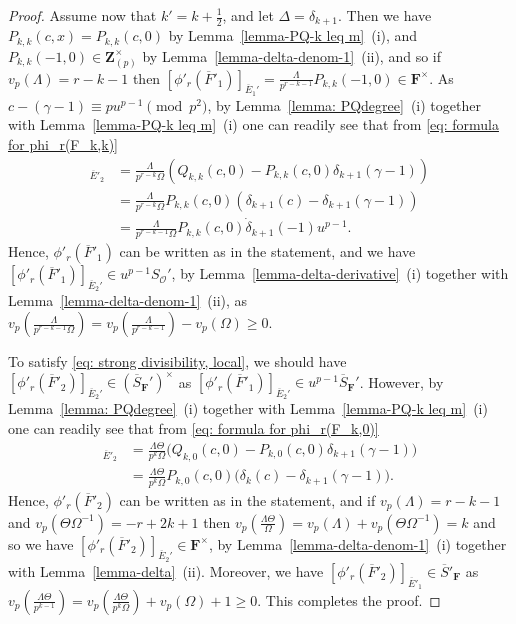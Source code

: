 \documentclass[11pt]{amsart}
\theoremstyle{definition}
\numberwithin{equation}{subsection}
\theoremstyle{plain}
\theoremstyle{plain}
\theoremstyle{plain}
\theoremstyle{plain}
\theoremstyle{plain}
\theoremstyle{plain}
\theoremstyle{plain}
\theoremstyle{plain}
\theoremstyle{plain}
\theoremstyle{plain}
\theoremstyle{plain}
\theoremstyle{plain}
\theoremstyle{definition}
\theoremstyle{definition}
\theoremstyle{definition}
\theoremstyle{remark}
\renewcommand{\(}{\textup{(}}
\renewcommand{\)}{\textup{)}}
\newcommand{\Z}{\mathbf{Z}}
\newcommand{\F}{\mathbf{F}}
\newcommand{\barS}{\overline{S}}
\newcommand{\cO}{\mathcal{O}}
\newcommand{\barE}{\overline{E}}
\newcommand{\barF}{\overline{F}}
\begin{document}
\begin{proof}
Assume now that $k'=k+\frac{1}{2}$, and let $\Delta=\delta_{k+1}$. Then we have $P_{k,k}(c,x)=P_{k,k}(c,0)$ by Lemma~\ref{lemma-PQ-k leq m}~(i), and $P_{k,k}(-1,0)\in\Z_{(p)}^{\times}$ by Lemma~\ref{lemma-delta-denom-1}~(ii), and so if $v_p(\Lambda)=r-k-1$ then $[\phi'_r(\barF'_1)]_{\barE_1'}=\frac{\Lambda}{p^{r-k-1}}P_{k,k}(-1,0)\in\F^{\times}$. As $c-(\gamma-1)\equiv pu^{p-1}\pmod{p^2}$, by Lemma~\ref{lemma: PQdegree}~(i) together with Lemma~\ref{lemma-PQ-k leq m}~(i) one can readily see that from \eqref{eq: formula for phi_r(F_k,k)}
\begin{align*}
[\phi'_r(\barF'_1)]_{\barE'_2}&=\frac{\Lambda}{p^{r-k}\Omega}\left(Q_{k,k}(c,0) -P_{k,k}(c,0)\delta_{k+1}(\gamma-1)\right) \\ &=\frac{\Lambda}{p^{r-k}\Omega}P_{k,k}(c,0)\left(\delta_{k+1}(c)-\delta_{k+1}(\gamma-1)\right)\\
&=\frac{\Lambda}{p^{r-k-1}\Omega}P_{k,k}(c,0)\dot{\delta}_{k+1}(-1)u^{p-1}.
\end{align*}
Hence, $\phi'_r(\barF'_1)$ can be written as in the statement, and we have $[\phi'_r(\barF'_1)]_{\barE_2'}\in u^{p-1}S_\cO'$, by Lemma~\ref{lemma-delta-derivative}~(i) together with Lemma~\ref{lemma-delta-denom-1}~(ii), as $v_p(\frac{\Lambda}{p^{r-k-1}\Omega})=v_p(\frac{\Lambda}{p^{r-k-1}})-v_p(\Omega)\geq 0$.



To satisfy \eqref{eq: strong divisibility, local}, we should have $[\phi'_r(\barF'_2)]_{\barE_2'}\in (\barS_\F')^\times$ as $[\phi'_r(\barF'_1)]_{\barE_2'}\in u^{p-1}\barS_\F'$. However, by Lemma~\ref{lemma: PQdegree}~(i) together with Lemma~\ref{lemma-PQ-k leq m}~(i) one can readily see that from \eqref{eq: formula for phi_r(F_k,0)}
\begin{align*}
[\phi'_r(\barF'_2)]_{\barE'_2}&=\frac{\Lambda\Theta}{p^k\Omega} \big(Q_{k,0}(c,0)-P_{k,0}(c,0)\delta_{k+1}(\gamma-1)\big)\\
&=\frac{\Lambda\Theta}{p^k\Omega} P_{k,0}(c,0)\big(\delta_k(c)-\delta_{k+1}(\gamma-1)\big).
\end{align*}
Hence, $\phi'_r(\barF'_2)$ can be written as in the statement, and if $v_p(\Lambda)=r-k-1$ and $v_p(\Theta\Omega^{-1})=-r+2k+1$ then $v_p(\frac{\Lambda\Theta}{\Omega})=v_p(\Lambda)+v_p(\Theta\Omega^{-1})=k$ and so we have $[\phi'_r(\barF'_2)]_{\barE_2'}\in \F^\times$, by Lemma~\ref{lemma-delta-denom-1}~(i) together with Lemma~\ref{lemma-delta}~(ii). Moreover, we have $[\phi'_r(\barF'_2)]_{\barE'_1}\in \barS'_\F$ as $v_p(\frac{\Lambda\Theta}{p^{k-1}})=v_p(\frac{\Lambda\Theta}{p^k\Omega})+v_p(\Omega)+1\geq 0$. This completes the proof.
\end{proof}
\end{document}
